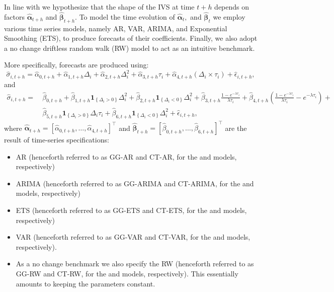 \documentclass[12pt,a4paper]{article}
\begin{document}
In line with \cite{Chalamandaris2014} we hypothesize that the shape of the IVS at time $t+h$ depends on factors $\widehat{\boldsymbol{\alpha}}_{t+h}$ and $\widehat{\boldsymbol{\beta}}_{t+h}$. To model the time evolution of $\widehat{\boldsymbol{\alpha}}_{t},$ and $\widehat{\boldsymbol{\beta}}_{t}$ we employ various time series models, namely AR, VAR, ARIMA, and Exponential Smoothing (ETS), to produce forecasts of their coefficients. Finally, we also adopt a no change driftless random walk (RW) model to act as an intuitive benchmark.

More specifically, forecasts are produced using:
\[
\widehat{\sigma}_{i,t+h}=\widehat{\alpha}_{0,t+h}+\widehat{\alpha}_{1,t+h}\Delta_{i}+\widehat{\alpha}_{2,t+h}\Delta_{i}^{2}+\widehat{\alpha}_{3,t+h}\tau_{i}+\widehat{\alpha}_{4,t+h}\left(\Delta_{i}\times\tau_{i}\right)+\widehat{\epsilon}_{i,t+h},
\]
and
\begin{align*}
\widehat{\sigma}_{i,t+h}=\ & \widehat{\beta}_{0,t+h}+\widehat{\beta}_{1,t+h}\mathbf{1}_{\left\{ \Delta_{i}>0\right\} }\Delta_{i}^{2}+\widehat{\beta}_{2,t+h}\mathbf{1}_{\left\{ \Delta_{i}<0\right\} }\Delta_{i}^{2}+\widehat{\beta}_{3,t+h}\frac{1-e^{-\lambda\tau_{i}}}{\lambda\tau_{i}}+\widehat{\beta}_{4,t+h}\left(\frac{1-e^{-\lambda\tau_{i}}}{\lambda\tau_{i}}-e^{-\lambda\tau_{i}}\right)+\\
&\widehat{\beta}_{5,t+h}\mathbf{1}_{\left\{ \Delta_{i}>0\right\} }\Delta_{i}\tau_{i}+\widehat{\beta}_{6,t+h}\mathbf{1}_{\left\{ \Delta_{i}<0\right\} }\Delta_{i}^{2}+\widehat{\epsilon}_{i,t+h},
\end{align*}
where $\widehat{\boldsymbol{\alpha}}_{t+h}=\left[\widehat{\alpha}_{0,t+h},\ldots,\widehat{\alpha}_{4,t+h}\right]^{\top}$ and $\widehat{\boldsymbol{\beta}}_{t+h}=\left[\widehat{\beta}_{0,t+h},\ldots,\widehat{\beta}_{6,t+h}\right]^{\top}$ are the result of time-series specifications:
\begin{itemize}
\item AR (henceforth referred to as GG-AR and CT-AR, for the \cite{goncalves2006predictable} and \cite{chalamandaris2011important} models, respectively)
\item ARIMA (henceforth referred to as GG-ARIMA and CT-ARIMA, for the \cite{goncalves2006predictable} and \cite{chalamandaris2011important} models, respectively)
\item ETS (henceforth referred to as GG-ETS and CT-ETS, for the \cite{goncalves2006predictable} and \cite{chalamandaris2011important} models, respectively)
\item VAR (henceforth referred to as GG-VAR and CT-VAR, for the \cite{goncalves2006predictable} and \cite{chalamandaris2011important} models, respectively).
\item As a no change benchmark we also specify the RW (henceforth referred to as GG-RW and CT-RW, for the \cite{goncalves2006predictable} and \cite{chalamandaris2011important} models, respectively). This essentially amounts to keeping the parameters constant.
\end{itemize}
\end{document}
